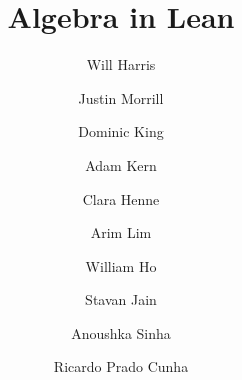 \title{Algebra in Lean}
\author{Will Harris \and Justin Morrill \and Dominic King \and Adam Kern \and Clara Henne \and Arim Lim \and 
William Ho \and Stavan Jain \and Anoushka Sinha \and Ricardo Prado Cunha}


\maketitle


